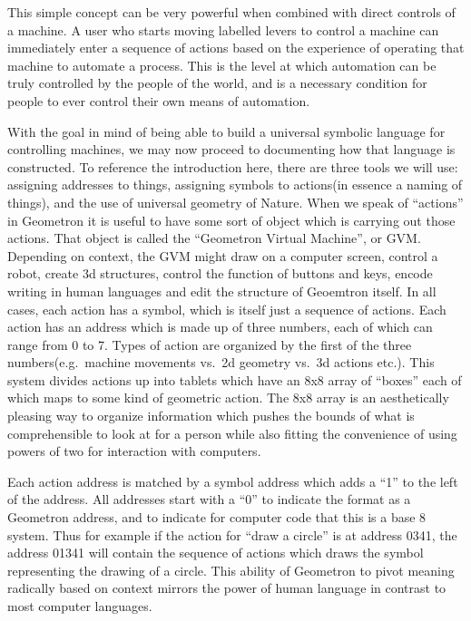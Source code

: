 \documentclass[12pt,a4paper]{amsart}
\numberwithin{equation}{section}
\begin{document}
This simple concept can be very powerful when combined with direct
controls of a machine. A user who starts moving labelled levers to
control a machine can immediately enter a sequence of actions based on
the experience of operating that machine to automate a process. This is
the level at which automation can be truly controlled by the people of
the world, and is a necessary condition for people to ever control their
own means of automation.

With the goal in mind of being able to build a universal symbolic
language for controlling machines, we may now proceed to documenting how
that language is constructed. To reference the introduction here, there
are three tools we will use: assigning addresses to things, assigning
symbols to actions(in essence a naming of things), and the use of
universal geometry of Nature. When we speak of ``actions'' in Geometron
it is useful to have some sort of object which is carrying out those
actions. That object is called the ``Geometron Virtual Machine'', or
GVM. Depending on context, the GVM might draw on a computer screen,
control a robot, create 3d structures, control the function of buttons
and keys, encode writing in human languages and edit the structure of
Geoemtron itself. In all cases, each action has a symbol, which is
itself just a sequence of actions. Each action has an address which is
made up of three numbers, each of which can range from 0 to 7. Types of
action are organized by the first of the three numbers(e.g.~machine
movements vs.~2d geometry vs.~3d actions etc.). This system divides
actions up into tablets which have an 8x8 array of ``boxes'' each of
which maps to some kind of geometric action. The 8x8 array is an
aesthetically pleasing way to organize information which pushes the
bounds of what is comprehensible to look at for a person while also
fitting the convenience of using powers of two for interaction with
computers.

Each action address is matched by a symbol address which adds a ``1'' to
the left of the address. All addresses start with a ``0'' to indicate
the format as a Geometron address, and to indicate for computer code
that this is a base 8 system. Thus for example if the action for ``draw
a circle'' is at address 0341, the address 01341 will contain the
sequence of actions which draws the symbol representing the drawing of a
circle. This ability of Geometron to pivot meaning radically based on
context mirrors the power of human language in contrast to most computer
languages.
\end{document}
